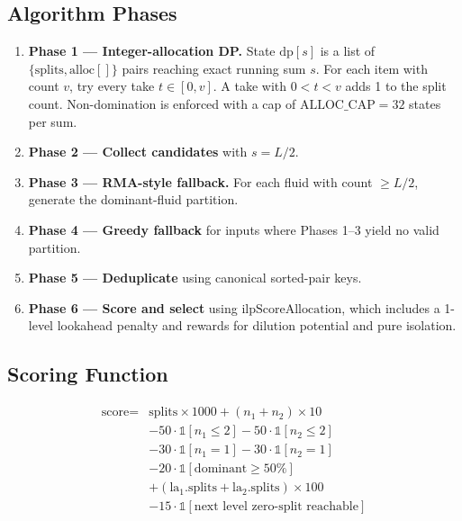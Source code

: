 \subsection{Algorithm Phases}

\begin{enumerate}
    \item \textbf{Phase 1 --- Integer-allocation DP.} State $\text{dp}[s]$ is a list of $\{\text{splits}, \text{alloc}[]\}$ pairs reaching exact running sum $s$. For each item with count $v$, try every take $t \in [0, v]$. A take with $0 < t < v$ adds 1 to the split count. Non-domination is enforced with a cap of $\text{ALLOC\_CAP} = 32$ states per sum.
    
    \item \textbf{Phase 2 --- Collect candidates} with $s = L/2$.
    
    \item \textbf{Phase 3 --- RMA-style fallback.} For each fluid with count $\geq L/2$, generate the dominant-fluid partition.
    
    \item \textbf{Phase 4 --- Greedy fallback} for inputs where Phases 1--3 yield no valid partition.
    
    \item \textbf{Phase 5 --- Deduplicate} using canonical sorted-pair keys.
    
    \item \textbf{Phase 6 --- Score and select} using $\text{ilpScoreAllocation}$, which includes a 1-level lookahead penalty and rewards for dilution potential and pure isolation.
\end{enumerate}

\subsection{Scoring Function}

\begin{equation}
\begin{split}
\text{score} = {} & \text{splits} \times 1000 + (n_1 + n_2) \times 10 \\
& - 50 \cdot \mathbb{1}[n_1 \leq 2] - 50 \cdot \mathbb{1}[n_2 \leq 2] \\
& - 30 \cdot \mathbb{1}[n_1 = 1] - 30 \cdot \mathbb{1}[n_2 = 1] \\
& - 20 \cdot \mathbb{1}[\text{dominant} \geq 50\%] \\
& + (\text{la}_1.\text{splits} + \text{la}_2.\text{splits}) \times 100 \\
& - 15 \cdot \mathbb{1}[\text{next level zero-split reachable}]
\end{split}
\end{equation}


